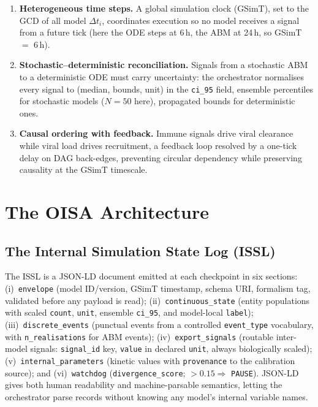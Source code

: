 \documentclass[conference,letterpaper,10pt]{IEEEtran}
\begin{document}
\begin{enumerate}
\item \textbf{Heterogeneous time steps.} A global simulation clock
      (GSimT), set to the GCD of all model $\Delta t_i$, coordinates
      execution so no model receives a signal from a future tick (here the
      ODE steps at 6\,h, the ABM at 24\,h, so GSimT $=$ 6\,h).
\item \textbf{Stochastic--deterministic reconciliation.} Signals from a
      stochastic ABM to a deterministic ODE must carry uncertainty: the
      orchestrator normalises every signal to (median, bounds, unit) in the
      \texttt{ci\_95} field, ensemble percentiles for stochastic models
      ($N\!=\!50$ here), propagated bounds for deterministic ones.
\item \textbf{Causal ordering with feedback.} Immune signals drive viral
      clearance while viral load drives recruitment, a feedback loop
      resolved by a one-tick delay on DAG back-edges, preventing circular
      dependency while preserving causality at the GSimT timescale.
\end{enumerate}

\section{The OISA Architecture}

\subsection{The Internal Simulation State Log (ISSL)}\label{sec:issl}
The ISSL is a JSON-LD document emitted at each checkpoint in six
sections: (i)~\texttt{envelope} (model ID/version, GSimT timestamp,
schema URI, formalism tag, validated before any payload is read);
(ii)~\texttt{continuous\_state} (entity populations with scaled
\texttt{count}, \texttt{unit}, ensemble \texttt{ci\_95}, and model-local
\texttt{label}); (iii)~\texttt{discrete\_events} (punctual events from a
controlled \texttt{event\_type} vocabulary, with \texttt{n\_realisations}
for ABM events); (iv)~\texttt{export\_signals} (routable inter-model
signals: \texttt{signal\_id} key, \texttt{value} in declared \texttt{unit},
always biologically scaled); (v)~\texttt{internal\_parameters} (kinetic
values with \texttt{provenance} to the calibration source); and
(vi)~\texttt{watchdog} (\texttt{divergence\_score}; $>\!0.15 \Rightarrow$
\texttt{PAUSE}). JSON-LD gives both human readability and machine-parsable
semantics, letting the orchestrator parse records without knowing any
model's internal variable names.
\end{document}
